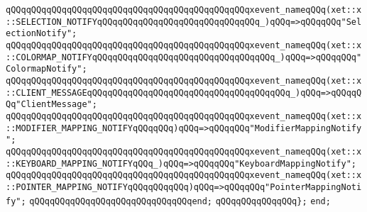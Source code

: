 \verb|qQQqqQQqqQQqqQQqqQQqqQQqqQQqqQQqqQQqqQQqqQQqqQQqxevent_nameqQQq(xet::x::SELECTION_NOTIFYqQQqqQQqqQQqqQQqqQQqqQQqqQQqqQQq_)qQQq=>qQQqqQQq"SelectionNotify";|\newline
\verb|qQQqqQQqqQQqqQQqqQQqqQQqqQQqqQQqqQQqqQQqqQQqqQQqxevent_nameqQQq(xet::x::COLORMAP_NOTIFYqQQqqQQqqQQqqQQqqQQqqQQqqQQqqQQqqQQq_)qQQq=>qQQqqQQq"ColormapNotify";|\newline
\verb|qQQqqQQqqQQqqQQqqQQqqQQqqQQqqQQqqQQqqQQqqQQqqQQqxevent_nameqQQq(xet::x::CLIENT_MESSAGEqQQqqQQqqQQqqQQqqQQqqQQqqQQqqQQqqQQqqQQq_)qQQq=>qQQqqQQq"ClientMessage";|\newline
\verb|qQQqqQQqqQQqqQQqqQQqqQQqqQQqqQQqqQQqqQQqqQQqqQQqxevent_nameqQQq(xet::x::MODIFIER_MAPPING_NOTIFYqQQqqQQq)qQQq=>qQQqqQQq"ModifierMappingNotify";|\newline
\verb|qQQqqQQqqQQqqQQqqQQqqQQqqQQqqQQqqQQqqQQqqQQqqQQqxevent_nameqQQq(xet::x::KEYBOARD_MAPPING_NOTIFYqQQq_)qQQq=>qQQqqQQq"KeyboardMappingNotify";|\newline
\verb|qQQqqQQqqQQqqQQqqQQqqQQqqQQqqQQqqQQqqQQqqQQqqQQqxevent_nameqQQq(xet::x::POINTER_MAPPING_NOTIFYqQQqqQQqqQQq)qQQq=>qQQqqQQq"PointerMappingNotify";|\newline
\verb|qQQqqQQqqQQqqQQqqQQqqQQqqQQqqQQqend;|\newline
\newline
\verb|qQQqqQQqqQQqqQQq};|\newline
\verb|end;|\newline
\newline

